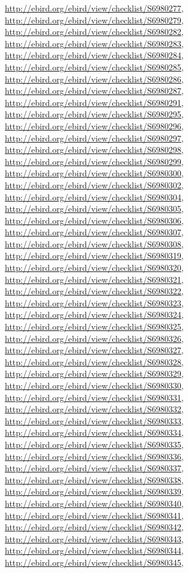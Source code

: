 \documentclass[9pt, article]{memoir}
\begin{document}
\begin{multicols}{2}
\url{http://ebird.org/ebird/view/checklist/S6980277}, 
\url{http://ebird.org/ebird/view/checklist/S6980279}, 
\url{http://ebird.org/ebird/view/checklist/S6980282}, 
\url{http://ebird.org/ebird/view/checklist/S6980283}, 
\url{http://ebird.org/ebird/view/checklist/S6980284}, 
\url{http://ebird.org/ebird/view/checklist/S6980285}, 
\url{http://ebird.org/ebird/view/checklist/S6980286}, 
\url{http://ebird.org/ebird/view/checklist/S6980287}, 
\url{http://ebird.org/ebird/view/checklist/S6980291}, 
\url{http://ebird.org/ebird/view/checklist/S6980295}, 
\url{http://ebird.org/ebird/view/checklist/S6980296}, 
\url{http://ebird.org/ebird/view/checklist/S6980297}, 
\url{http://ebird.org/ebird/view/checklist/S6980298}, 
\url{http://ebird.org/ebird/view/checklist/S6980299}, 
\url{http://ebird.org/ebird/view/checklist/S6980300}, 
\url{http://ebird.org/ebird/view/checklist/S6980302}, 
\url{http://ebird.org/ebird/view/checklist/S6980304}, 
\url{http://ebird.org/ebird/view/checklist/S6980305}, 
\url{http://ebird.org/ebird/view/checklist/S6980306}, 
\url{http://ebird.org/ebird/view/checklist/S6980307}, 
\url{http://ebird.org/ebird/view/checklist/S6980308}, 
\url{http://ebird.org/ebird/view/checklist/S6980319}, 
\url{http://ebird.org/ebird/view/checklist/S6980320}, 
\url{http://ebird.org/ebird/view/checklist/S6980321}, 
\url{http://ebird.org/ebird/view/checklist/S6980322}, 
\url{http://ebird.org/ebird/view/checklist/S6980323}, 
\url{http://ebird.org/ebird/view/checklist/S6980324}, 
\url{http://ebird.org/ebird/view/checklist/S6980325}, 
\url{http://ebird.org/ebird/view/checklist/S6980326}, 
\url{http://ebird.org/ebird/view/checklist/S6980327}, 
\url{http://ebird.org/ebird/view/checklist/S6980328}, 
\url{http://ebird.org/ebird/view/checklist/S6980329}, 
\url{http://ebird.org/ebird/view/checklist/S6980330}, 
\url{http://ebird.org/ebird/view/checklist/S6980331}, 
\url{http://ebird.org/ebird/view/checklist/S6980332}, 
\url{http://ebird.org/ebird/view/checklist/S6980333}, 
\url{http://ebird.org/ebird/view/checklist/S6980334}, 
\url{http://ebird.org/ebird/view/checklist/S6980335}, 
\url{http://ebird.org/ebird/view/checklist/S6980336}, 
\url{http://ebird.org/ebird/view/checklist/S6980337}, 
\url{http://ebird.org/ebird/view/checklist/S6980338}, 
\url{http://ebird.org/ebird/view/checklist/S6980339}, 
\url{http://ebird.org/ebird/view/checklist/S6980340}, 
\url{http://ebird.org/ebird/view/checklist/S6980341}, 
\url{http://ebird.org/ebird/view/checklist/S6980342}, 
\url{http://ebird.org/ebird/view/checklist/S6980343}, 
\url{http://ebird.org/ebird/view/checklist/S6980344}, 
\url{http://ebird.org/ebird/view/checklist/S6980345}, 

\end{multicols}
\end{document}
